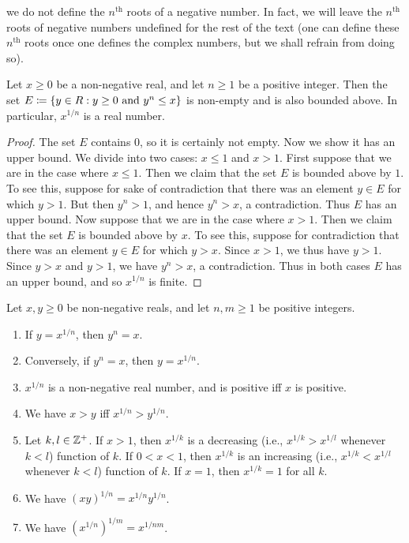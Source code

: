 \begin{note}
  we do not define the \(n^{\text{th}}\) roots of a negative number.
  In fact, we will leave the \(n^{\text{th}}\) roots of negative numbers undefined for the rest of the text
  (one can define these \(n^{\text{th}}\) roots once one defines the complex numbers, but we shall refrain from doing so).
\end{note}

\begin{lem}\label{5.6.5}
  Let \(x \geq 0\) be a non-negative real, and let \(n \geq 1\) be a positive integer.
  Then the set \(E \coloneqq \left\lbrace y \in R : y \geq 0 \text{ and } y^n \leq x\right\rbrace\) is non-empty and is also bounded above.
  In particular, \(x^{1 / n}\) is a real number.
\end{lem}

\begin{proof}
  The set \(E\) contains \(0\), so it is certainly not empty.
  Now we show it has an upper bound.
  We divide into two cases: \(x \leq 1\) and \(x > 1\).
  First suppose that we are in the case where \(x \leq 1\).
  Then we claim that the set \(E\) is bounded above by \(1\).
  To see this, suppose for sake of contradiction that there was an element \(y \in E\) for which \(y > 1\).
  But then \(y^n > 1\), and hence \(y^n > x\), a contradiction.
  Thus \(E\) has an upper bound.
  Now suppose that we are in the case where \(x > 1\).
  Then we claim that the set \(E\) is bounded above by \(x\).
  To see this, suppose for contradiction that there was an element \(y \in E\) for which \(y > x\).
  Since \(x > 1\), we thus have \(y > 1\).
  Since \(y > x\) and \(y > 1\), we have \(y^n > x\), a contradiction.
  Thus in both cases \(E\) has an upper bound, and so \(x^{1 / n}\) is finite.
\end{proof}

\begin{lem}\label{5.6.6}
  Let \(x, y \geq 0\) be non-negative reals, and let \(n, m \geq 1\) be positive integers.
  \begin{enumerate}
    \item If \(y = x^{1 / n}\), then \(y^n = x\).
    \item Conversely, if \(y^n = x\), then \(y = x^{1 / n}\).
    \item \(x^{1 / n}\) is a non-negative real number, and is positive iff \(x\) is positive.
    \item We have \(x > y\) iff \(x^{1 / n} > y^{1 / n}\).
    \item Let \(k, l \in \mathbb{Z}^+\).
          If \(x > 1\), then \(x^{1 / k}\) is a decreasing (i.e., \(x^{1 / k} > x^{1 / l}\) whenever \(k < l\)) function of \(k\).
          If \(0 < x < 1\), then \(x^{1 / k}\) is an increasing (i.e., \(x^{1 / k} < x^{1 / l}\) whenever \(k < l\)) function of \(k\).
          If \(x = 1\), then \(x^{1 / k} = 1\) for all \(k\).
    \item We have \((xy)^{1 / n} = x^{1 / n} y^{1 / n}\).
    \item We have \((x^{1 / n})^{1 / m} = x^{1 / nm}\).
  \end{enumerate}
\end{lem}

